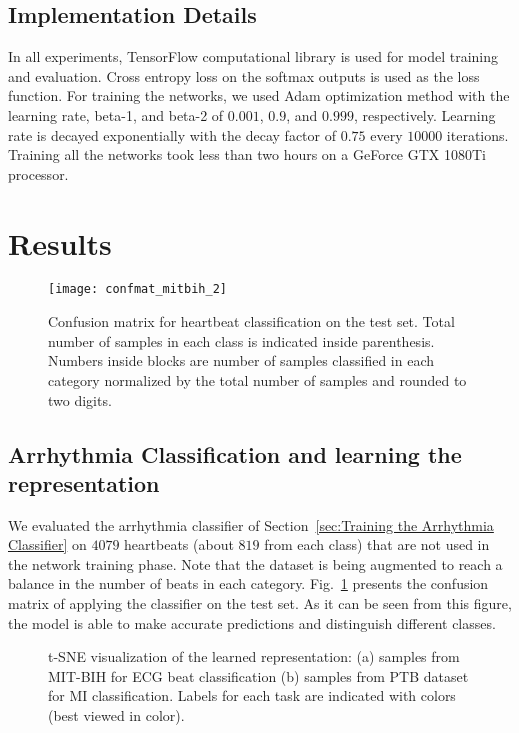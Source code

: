\documentclass[10pt, conference, compsocconf]{IEEEtran}
\begin{document}
\subsection{Implementation Details}
In all experiments, TensorFlow computational library \cite{abadi2016tensorflow} is used for model training and evaluation. Cross entropy loss on the softmax outputs is used as the loss function. For training the networks, we used Adam optimization method \cite{kingma2014adam} with the learning rate, beta-1, and beta-2 of $0.001$, $0.9$, and $0.999$, respectively. Learning rate is decayed exponentially with the decay factor of $0.75$ every $10000$ iterations. Training all the networks took less than two hours on a GeForce GTX 1080Ti processor.




\section{Results}
\label{sec:Results}

\begin{figure}[!t]
\centering
\texttt{[image: confmat\_mitbih\_2]}\caption{Confusion matrix for heartbeat classification on the test set. Total number of samples in each class is indicated inside parenthesis. Numbers inside blocks are number of samples classified in each category normalized by the total number of samples and rounded to two digits.}
\label{fig:confmat_mitbih}
\end{figure}

\subsection{Arrhythmia Classification and learning the representation}
We evaluated the arrhythmia classifier of Section~\ref{sec:Training the Arrhythmia Classifier} on $4079$ heartbeats (about $819$ from each class) that are not used in the network training phase. Note that the dataset is being augmented to reach a balance in the number of beats in each category. Fig.~\ref{fig:confmat_mitbih} presents the confusion matrix of applying the classifier on the test set. As it can be seen from this figure, the model is able to make accurate predictions and distinguish different classes.



\begin{figure*}[!t]
\centering
{}
\caption{t-SNE visualization of the learned representation: (a) samples from MIT-BIH for ECG beat classification (b) samples from PTB dataset for MI classification. Labels for each task are indicated with colors (best viewed in color).}
\label{fig:tsne}
\end{figure*}
\end{document}
